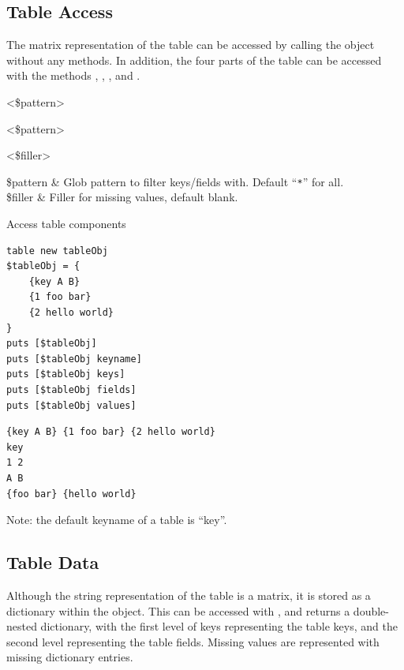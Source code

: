 \subsection{Table Access}
The matrix representation of the table can be accessed by calling the object without any methods. 
In addition, the four parts of the table can be accessed with the methods , , , and .

\begin{syntax}
\end{syntax}
\begin{syntax}
 <\$pattern>
\end{syntax}
\begin{syntax}
 <\$pattern>
\end{syntax}
\begin{syntax}
 <\$filler>
\end{syntax}
\begin{args}
\$pattern & Glob pattern to filter keys/fields with. Default ``\texttt{*}'' for all. \\
\$filler & Filler for missing values, default blank.
\end{args}

\begin{example}{Access table components}
\begin{lstlisting}
table new tableObj
$tableObj = {
    {key A B}
    {1 foo bar}
    {2 hello world}
}
puts [$tableObj]
puts [$tableObj keyname]
puts [$tableObj keys]
puts [$tableObj fields]
puts [$tableObj values]
\end{lstlisting}
\tcblower
\begin{lstlisting}
{key A B} {1 foo bar} {2 hello world}
key
1 2
A B
{foo bar} {hello world}
\end{lstlisting}
\end{example}
Note: the default keyname of a table is ``key''.

\clearpage

\subsection{Table Data}
Although the string representation of the table is a matrix, it is stored as a dictionary within the object. This can be accessed with  , and returns a double-nested dictionary, with the first level of keys representing the table keys, and the second level representing the table fields. Missing values are represented with missing dictionary entries.
\begin{syntax}
\end{syntax}

